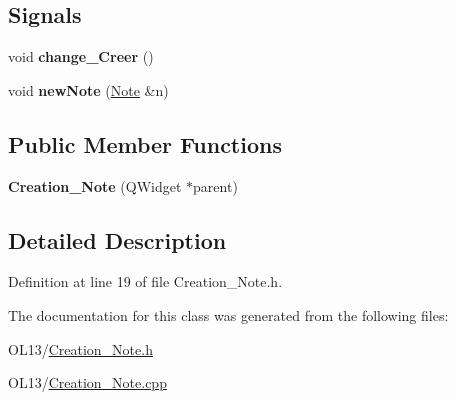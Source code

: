 \subsection*{Signals}
\begin{DoxyCompactItemize}
\item 
\mbox{\label{class_creation___note_ac077793d8161d266c9d500c6545da80e}} 
void {\bfseries change\+\_\+\+Creer} ()
\item 
\mbox{\label{class_creation___note_a51d4541fbf18ccb297ce5f15da3a6cab}} 
void {\bfseries new\+Note} (\hyperlink{class_note}{Note} \&n)
\end{DoxyCompactItemize}
\subsection*{Public Member Functions}
\begin{DoxyCompactItemize}
\item 
\mbox{\label{class_creation___note_a76278cf9f0de87cd61f204aafcebd5d2}} 
{\bfseries Creation\+\_\+\+Note} (Q\+Widget $\ast$parent)
\end{DoxyCompactItemize}


\subsection{Detailed Description}


Definition at line 19 of file Creation\+\_\+\+Note.\+h.



The documentation for this class was generated from the following files\+:\begin{DoxyCompactItemize}
\item 
O\+L13/\hyperlink{_creation___note_8h}{Creation\+\_\+\+Note.\+h}\item 
O\+L13/\hyperlink{_creation___note_8cpp}{Creation\+\_\+\+Note.\+cpp}\end{DoxyCompactItemize}

